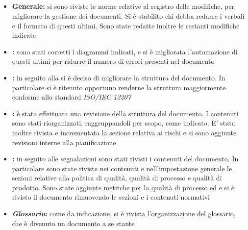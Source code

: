 \documentclass[12pt,a4paper]{article}
\begin{document}
\subsection{\RR}
\begin{itemize}
	\item \textbf{Generale:} si sono riviste le norme relative al registro delle modifiche, per migliorare la gestione dei documenti. Si è stabilito chi debba redarre i verbali e il formato di questi ultimi. Sono state redatte inoltre le restanti modifiche indicate
	\item \textbf{\AdR{}:} sono stati corretti i diagrammi indicati, e si è migliorata l'automazione di questi ultimi per ridurre il numero di errori presenti nel documento
	\item \textbf{\NdP{}:} in seguito alla \RR{} si è deciso di migliorare la struttura del documento. In particolare si è ritenuto opportuno renderne la struttura maggiormente conforme allo standard \textit{ISO/IEC 12207}
	\item \textbf{\PdP{}:} è stata effettuata una revisione della struttura del documento. I contenuti sono stati riorganizzati, raggruppandoli per scopo, come indicato. E' stata inoltre rivista e incrementata la sezione relativa ai rischi e si sono aggiunte revisioni interne alla pianificazione
	\item \textbf{\PdQ{}:} in seguito alle segnalazioni sono stati rivisti i contenuti del documento. In particolare sono state riviste nei contenuti e nell'impostazione generale le sezioni relative alla politica di qualità, qualità di processo e qualità di prodotto. Sono state aggiunte metriche per la qualità di processo ed e si è rivisto il documento rimuovendo le sezioni e i contenuti normativi
	\item \textbf{\textit{Glossario}:} come da indicazione, si è rivista l'organizzazione del glossario, che è divenuto un documento a se stante
\end{itemize}
\end{document}
